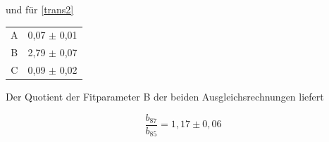 und für \ref{trans2}

\begin{table}[h!]
\centering
\begin{tabular}{cc} \toprule
\centering
A & 0,07 $\pm$ 0,01 \\
B & 2,79 $\pm$ 0,07 \\
C & 0,09 $\pm$ 0,02 \\
\bottomrule
\end{tabular}
\end{table}

Der Quotient der Fitparameter B der beiden Ausgleichsrechnungen liefert

\begin{equation}
\frac{b_{87}}{b_{85}} = 1,17 \pm 0,06
\end{equation}
